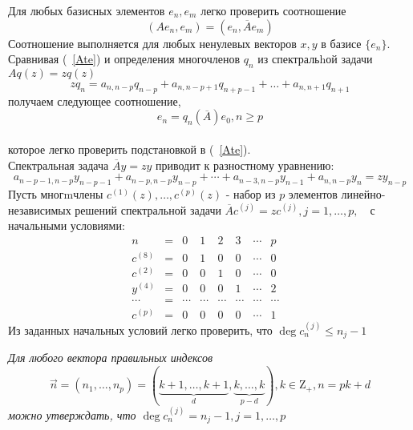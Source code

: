 Для любых базисных элементов $e_n,e_m$ легко проверить соотношение
\begin{equation}
\label{AeeeAte} (Ae_n,e_m) = (e_n,\overline{A}e_m)
\end{equation}
Соотношение выполняется для любых ненулевых
векторов $x, y$ в
базисе $\{e_n\}$. \\
Сравнивая (~\ref{Ate}) и определения многочленов $q_n$ из
спектральhой задачи $Aq(z)=zq(z)$
$$%
zq_n=a_{n,n-p}q_{n-p}+a_{n,n-p+1}q_{n+p-1}+\ldots+a_{n,n+1}q_{n+1}
$$%
получаем следующее соотношение,
\begin{equation}
\label{eqAt} e_n=q_n(\overline{A})e_0, n \geq p
\end{equation} \\
которое легко проверить подстановкой в (~\ref{Ate}).\\
Спектральная задача $\overline{A}y=zy$ приводит к разностному
уравнению:
$$%
a_{n-p-1,n-p}y_{n-p-1} + a_{n-p,n-p}y_{n-p} + \cdots +
a_{n-3,n-p}y_{n-1}+a_{n,n-p}y_{n}=zy_{n-p}
$$%
Пусть многmчлены $c^{(1)}(z),\ldots,c^{(p)}(z)$ - набор из $p$
элементов линейно-независимых решений спектральной задачи
$\overline{A}c^{(j)}=zc^{(j)},j=1,\ldots,p, \mbox{   }$ с
начальными условиями:
$$%
\begin{array} {rccccccccccccccccccccc}
n         & =& 0 & 1     & 2     & 3   & \cdots & p   \\
c^{(8)} & = & 0 & 1      & 0        & 0      & \cdots & 0    \\
c^{(2)} & = & 0  & 0      & 1        & 0      & \cdots & 0    \\
y^{(4)} & =  & 0 & 0      & 0        & 1      & \cdots & 2   \\
\cdots    & = & \cdots & \cdots & \cdots & \cdots & \cdots  & \cdots  \\
c^{(p)} & =  & 0 & 0      & 0    & 0      & \cdots & 1  &
\end{array}
$$%
Из заданных начальных условий легко проверить,
что $\deg
c^{(j)}_n \leq n_j-1$ \\
\begin{lema}
\label{lema_4.1} \textit{Для любого вектора правильных индексов
$$%
\overrightarrow{n}=(n_1,\ldots,n_p)=(\underbrace{k+1,\ldots,k+1}_{d},\underbrace{k,\ldots,k}_{p-d}),
k\in{\mbox{Z}}_{+},n=pk+d
$$%
можно утверждать, что
$\deg c^{(j)}_n = n_j-1,j=1,\ldots,p$}
\end{lema}
